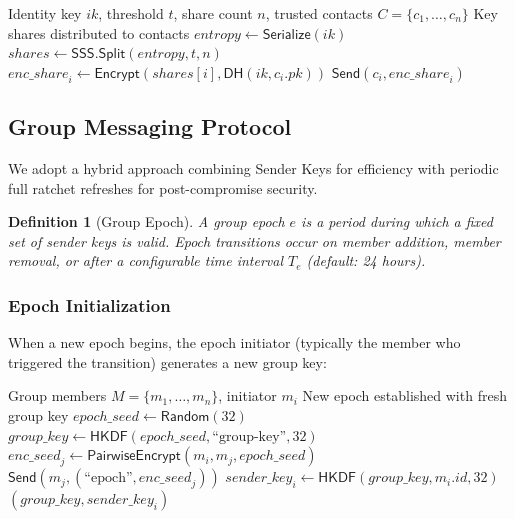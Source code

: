 \documentclass[11pt,a4paper]{article}
\newtheorem{definition}{Definition}
\begin{document}
\begin{algorithm}[H]
\caption{Distributed Key Backup}
\label{alg:key-backup}
\begin{algorithmic}[1]
\Require Identity key $\mathit{ik}$, threshold $t$, share count $n$, trusted contacts $C = \{c_1, \ldots, c_n\}$
\Ensure Key shares distributed to contacts
\State $\mathit{entropy} \leftarrow \mathsf{Serialize}(\mathit{ik})$
\State $\mathit{shares} \leftarrow \mathsf{SSS}.\mathsf{Split}(\mathit{entropy}, t, n)$
    \State $\mathit{enc\_share}_i \leftarrow \mathsf{Encrypt}(\mathit{shares}[i], \mathsf{DH}(\mathit{ik}, c_i.\mathit{pk}))$
    \State $\mathsf{Send}(c_i, \mathit{enc\_share}_i)$
\EndFor
\end{algorithmic}
\end{algorithm}

\subsection{Group Messaging Protocol}

We adopt a hybrid approach combining Sender Keys for efficiency with periodic full ratchet refreshes for post-compromise security.

\begin{definition}[Group Epoch]
A group epoch $e$ is a period during which a fixed set of sender keys is valid. Epoch transitions occur on member addition, member removal, or after a configurable time interval $T_e$ (default: 24 hours).
\end{definition}

\subsubsection{Epoch Initialization}

When a new epoch begins, the epoch initiator (typically the member who triggered the transition) generates a new group key:

\begin{algorithm}[H]
\caption{Group Epoch Initialization}
\label{alg:group-epoch}
\begin{algorithmic}[1]
\Require Group members $M = \{m_1, \ldots, m_n\}$, initiator $m_i$
\Ensure New epoch established with fresh group key
\State $\mathit{epoch\_seed} \leftarrow \mathsf{Random}(32)$
\State $\mathit{group\_key} \leftarrow \mathsf{HKDF}(\mathit{epoch\_seed}, \text{``group-key''}, 32)$
    \State $\mathit{enc\_seed}_j \leftarrow \mathsf{PairwiseEncrypt}(m_i, m_j, \mathit{epoch\_seed})$
    \State $\mathsf{Send}(m_j, (\text{``epoch''}, \mathit{enc\_seed}_j))$
\EndFor
\State $\mathit{sender\_key}_i \leftarrow \mathsf{HKDF}(\mathit{group\_key}, m_i.\mathit{id}, 32)$
\State \Return $(\mathit{group\_key}, \mathit{sender\_key}_i)$
\end{algorithmic}
\end{algorithm}
\end{document}
